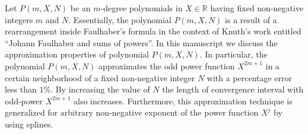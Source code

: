 Let $P(m, X, N)$ be an $m$-degree polynomials in $X\in\mathbb{R}$
having fixed non-negative integers $m$ and $N$.
Essentially, the polynomial $P(m, X, N)$ is a result of a rearrangement inside Faulhaber's formula
in the context of Knuth's work entitled ``Johann Faulhaber and sums of powers''.
In this manuscript we discuss the approximation properties of polynomial $P(m,X,N)$.
In particular, the polynomial $P(m,X,N)$ approximates the odd power function $X^{2m+1}$ in a certain neighborhood
of a fixed non-negative integer $N$ with a percentage error less than $1\%$.
By increasing the value of $N$ the length of convergence interval with odd-power $X^{2m+1}$ also increases.
Furthermore, this approximation technique is generalized for arbitrary non-negative exponent of the power function $X^j$
by using splines.
